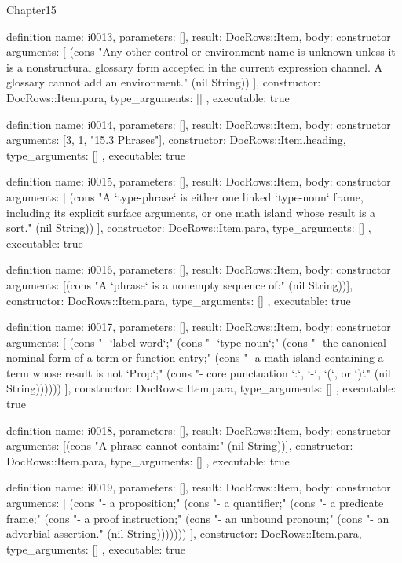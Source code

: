 \begin{lexlean}{Chapter15}
\begin{semanticmodule}
definition{
  name: i0013,
  parameters: [],
  result: DocRows::Item,
  body: constructor{
    arguments: [
      (cons "Any other control or environment name is unknown unless it is a nonstructural glossary form accepted in the current expression channel. A glossary cannot add an environment." (nil String))
    ],
    constructor: DocRows::Item.para,
    type_arguments: []
  },
  executable: true
}

definition{
  name: i0014,
  parameters: [],
  result: DocRows::Item,
  body: constructor{
    arguments: [3, 1, "15.3 Phrases"],
    constructor: DocRows::Item.heading,
    type_arguments: []
  },
  executable: true
}

definition{
  name: i0015,
  parameters: [],
  result: DocRows::Item,
  body: constructor{
    arguments: [
      (cons "A `type-phrase` is either one linked `type-noun` frame, including its explicit surface arguments, or one math island whose result is a sort." (nil String))
    ],
    constructor: DocRows::Item.para,
    type_arguments: []
  },
  executable: true
}

definition{
  name: i0016,
  parameters: [],
  result: DocRows::Item,
  body: constructor{
    arguments: [(cons "A `phrase` is a nonempty sequence of:" (nil String))],
    constructor: DocRows::Item.para,
    type_arguments: []
  },
  executable: true
}

definition{
  name: i0017,
  parameters: [],
  result: DocRows::Item,
  body: constructor{
    arguments: [
      (cons "- `label-word`;" (cons "- `type-noun`;" (cons "- the canonical nominal form of a term or function entry;" (cons "- a math island containing a term whose result is not `Prop`;" (cons "- core punctuation `:`, `-`, `(`, or `)`." (nil String))))))
    ],
    constructor: DocRows::Item.para,
    type_arguments: []
  },
  executable: true
}

definition{
  name: i0018,
  parameters: [],
  result: DocRows::Item,
  body: constructor{
    arguments: [(cons "A phrase cannot contain:" (nil String))],
    constructor: DocRows::Item.para,
    type_arguments: []
  },
  executable: true
}

definition{
  name: i0019,
  parameters: [],
  result: DocRows::Item,
  body: constructor{
    arguments: [
      (cons "- a proposition;" (cons "- a quantifier;" (cons "- a predicate frame;" (cons "- a proof instruction;" (cons "- an unbound pronoun;" (cons "- an adverbial assertion." (nil String)))))))
    ],
    constructor: DocRows::Item.para,
    type_arguments: []
  },
  executable: true
}


\end{semanticmodule}
\end{lexlean}
